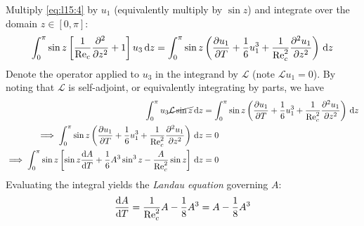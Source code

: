 \documentclass{jknotes}
\newcommand{\ReN}{\text{Re}}
\renewcommand{\L}{\mathcal{L}}
\begin{document}
Multiply \eqref{eq:l15:4} by $u_1$ (equivalently multiply by $\sin z$) and
integrate over the domain $z \in \left[0,\pi\right]$:
\begin{equation}
	\int_0^\pi \sin z \left[ \frac{1}{\ReN_c}\frac{\partial^2}{\partial z^2} +
	1\right] u_3 \, \diffd z = \int_0^\pi \sin z \left(
	\frac{\partial u_1}{\partial T} + \frac{1}{6}u_1^3 + \frac{1}{\ReN^2_c}
	\frac{\partial^2 u_1}{\partial z^2} \right) \, \diffd z
\end{equation}
Denote the operator applied to $u_3$ in the integrand by $\mathcal{L}$ (note
$\L u_1 = 0$). By noting that $\L$ is self-adjoint, or equivalently
integrating by parts, we have
\begin{align}
	\int_0^\pi u_3 \cancel{\L \sin z} \, \diffd z &= \int_0^\pi \sin z \left(
	\frac{\partial u_1}{\partial T} + \frac{1}{6}u_1^3 + \frac{1}{\ReN^2_c}
	\frac{\partial^2 u_1}{\partial z^2} \right) \, \diffd z \\
	\implies \int_0^\pi \sin z \left(
	\frac{\partial u_1}{\partial T} + \frac{1}{6}u_1^3 + \frac{1}{\ReN^2_c}
	\frac{\partial^2 u_1}{\partial z^2} \right) \, \diffd z &= 0 \\
	\implies \int_0^\pi \sin z \left[ \sin z \frac{\diffd A}{\diffd T} +
	\frac{1}{6}A^3 \sin^3 z - \frac{A}{\ReN_c^2} \sin z \right] \, \diffd z &=
	0
\end{align}
Evaluating the integral yields the \emph{Landau equation} governing $A$:
\begin{equation}
	\frac{\diffd A}{\diffd T} = \frac{1}{\ReN_c^2} A - \frac{1}{8} A^3 = A -
	\frac{1}{8}A^3
\end{equation}
\end{document}
